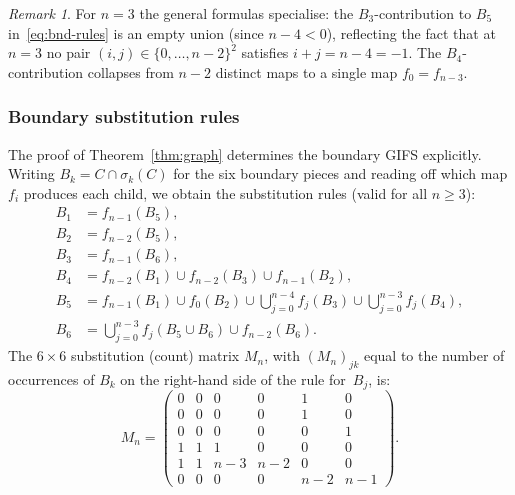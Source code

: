 \documentclass{amsart}
\theoremstyle{definition}
\theoremstyle{remark}
\newtheorem{remark}[theorem]{Remark}
\begin{document}
\begin{remark}
For $n = 3$ the general formulas specialise: the $B_3$-contribution
to $B_5$ in~\eqref{eq:bnd-rules} is an empty union (since
$n - 4 < 0$), reflecting the fact that at $n = 3$ no pair
$(i,j) \in \{0,\ldots,n{-}2\}^2$ satisfies $i + j = n{-}4 = -1$.
The $B_4$-contribution collapses from $n{-}2$ distinct maps to a
single map $f_0 = f_{n-3}$.
\end{remark}

\subsubsection{Boundary substitution rules}

The proof of Theorem~\ref{thm:graph} determines the boundary GIFS
explicitly.  Writing $B_k = C \cap \sigma_k(C)$ for the six
boundary pieces and reading off which map $f_i$ produces each
child, we obtain the substitution rules (valid for all $n \ge 3$):
\begin{equation}\label{eq:bnd-rules}
\begin{aligned}
  B_1 &= f_{n-1}(B_5), \\
  B_2 &= f_{n-2}(B_5), \\
  B_3 &= f_{n-1}(B_6), \\
  B_4 &= f_{n-2}(B_1) \cup f_{n-2}(B_3) \cup f_{n-1}(B_2), \\
  B_5 &= f_{n-1}(B_1) \cup f_0(B_2)
    \cup \bigcup_{j=0}^{n-4} f_j(B_3)
    \cup \bigcup_{j=0}^{n-3} f_j(B_4), \\
  B_6 &= \bigcup_{j=0}^{n-3} f_j(B_5 \cup B_6) \cup f_{n-2}(B_6).
\end{aligned}
\end{equation}
The $6 \times 6$ substitution (count) matrix $M_n$, with $(M_n)_{jk}$
equal to the number of occurrences of $B_k$ on the right-hand side of
the rule for~$B_j$, is:
\begin{equation}\label{eq:subst-matrix}
  M_n =
  \begin{pmatrix}
    0 & 0 & 0 & 0 & 1 & 0 \\
    0 & 0 & 0 & 0 & 1 & 0 \\
    0 & 0 & 0 & 0 & 0 & 1 \\
    1 & 1 & 1 & 0 & 0 & 0 \\
    1 & 1 & n{-}3 & n{-}2 & 0 & 0 \\
    0 & 0 &   0 &   0 & n{-}2 & n{-}1
  \end{pmatrix}.
\end{equation}
\end{document}
